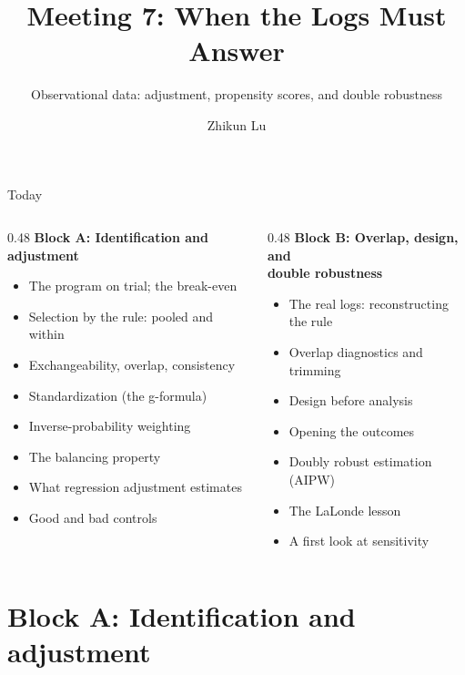 \documentclass[aspectratio=169, 11pt, handout]{beamer}
\title[Meeting 7]{Meeting 7: When the Logs Must Answer}
\subtitle{Observational data: adjustment, propensity scores, and double robustness}
\author{Zhikun Lu}
\date{}
\begin{document}
\begin{frame}
\titlepage
\end{frame}

\begin{frame}{Today}

\begin{columns}[T]
\begin{column}{0.48\textwidth}
\textbf{Block A: Identification and adjustment}
\begin{itemize}
  \item The program on trial; the break-even
  \item Selection by the rule: pooled and within
  \item Exchangeability, overlap, consistency
  \item Standardization (the g-formula)
  \item Inverse-probability weighting
  \item The balancing property
  \item What regression adjustment estimates
  \item Good and bad controls
\end{itemize}
\end{column}
\begin{column}{0.48\textwidth}
\textbf{Block B: Overlap, design, and\\ double robustness}
\begin{itemize}
  \item The real logs: reconstructing the rule
  \item Overlap diagnostics and trimming
  \item Design before analysis
  \item Opening the outcomes
  \item Doubly robust estimation (AIPW)
  \item The LaLonde lesson
  \item A first look at sensitivity
\end{itemize}
\end{column}
\end{columns}
\end{frame}

\section{Block A: Identification and adjustment}
\end{document}
